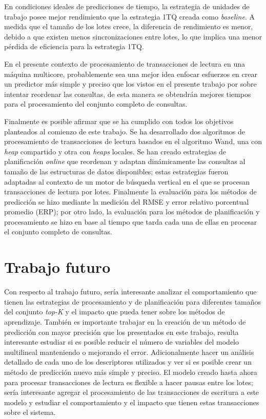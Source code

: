 En condiciones ideales de predicciones de tiempo, la estrategia de unidades de trabajo posee mejor rendimiento que la estrategia 1TQ creada como \textit{baseline}. A medida que el tamaño de los lotes crece, la diferencia de rendimiento es menor, debido a que existen menos sincronizaciones entre lotes, lo que implica una menor pérdida de eficiencia para la estrategia 1TQ.

En el presente contexto de procesamiento de transacciones de lectura en una máquina multicore, probablemente sea una mejor idea enfocar esfuerzos en crear un predictor más simple y preciso que los vistos en el presente trabajo por sobre intentar reordenar las consultas, de esta manera se obtendrán mejores tiempos para el procesamiento del conjunto completo de consultas.

Finalmente es posible afirmar que se ha cumplido con todos los objetivos planteados al comienzo de este trabajo. Se ha desarrollado dos algoritmos de procesamiento de transacciones de lectura basados en el algoritmo Wand, una con \textit{heap} compartido y otra con \textit{heaps} locales. Se han creado estrategias de planificación \textit{online} que reordenan y adaptan dinámicamente las consultas al tamaño de las estructuras de datos disponibles; estas estrategias fueron adaptadas al contexto de un motor de búsqueda vertical en el que se procesan transacciones de lectura por lotes. Finalmente la evaluación para los métodos de predicción se hizo mediante la medición del RMSE y error relativo porcentual promedio (ERP); por otro lado, la evaluación para los métodos de planificación y procesamiento se hizo en base al tiempo que tarda cada una de ellas en procesar el conjunto completo de consultas.

\section{Trabajo futuro}
\label{conclu:trabajofuturo}
Con respecto al trabajo futuro, sería interesante analizar el comportamiento que tienen las estrategias de procesamiento y de planificación para diferentes tamaños del conjunto \textit{top-K} y el impacto que pueda tener sobre los métodos de aprendizaje.
También es importante trabajar en la creación de un método de predicción con mayor precisión que los presentados en este trabajo, resulta interesante estudiar si es posible reducir el número de variables del modelo multilineal manteniendo o mejorando el error. Adicionalmente hacer un análisis detallado de cada uno de los descriptores utilizados y ver si es posible crear un método de predicción nuevo más simple y preciso.
El modelo creado hasta ahora para procesar transacciones de lectura es flexible a hacer pausas entre los lotes; sería interesante agregar el procesamiento de las transacciones de escritura a este modelo y estudiar el comportamiento y el impacto que tienen estas transacciones sobre el sistema.